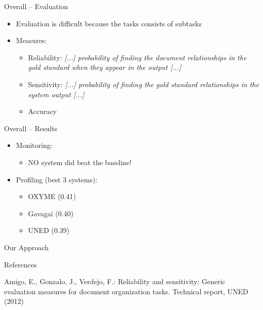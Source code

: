 \documentclass[12pt,a4paper]{beamer}
\begin{document}
\begin{frame}{Overall -- Evaluation}
\begin{itemize}
\item Evaluation is difficult because the tasks consists of subtasks
\item Measures:
\begin{itemize}
\item Reliability: \textit{[...] probability of finding the document relationships in the gold standard when they appear in the output [...]} \cite{amigo}
\item Sensitivity: \textit{[...] probability of finding the gold standard relationships in the system output [...]} \cite{amigo}
\item Accuracy
\end{itemize}
\end{itemize}
\end{frame}


\begin{frame}{Overall -- Results}
\begin{itemize}
\item Monitoring:
\begin{itemize}
\item NO system did beat the baseline!
\end{itemize}
\item Profiling (best 3 systems):
\begin{itemize}
\item OXYME (0.41)
\item Gavagai (0.40)
\item UNED (0.39)
\end{itemize}
\end{itemize}
\end{frame}

\begin{frame}{Our Approach}

\end{frame}


\begin{frame}{References}
\begin{thebibliography}{-}
 Amigo, E., Gonzalo, J., Verdejo, F.: Reliability and sensitivity: Generic evaluation
measures for document organization tasks. Technical report, UNED (2012)

\end{thebibliography}
\end{frame}
\end{document}
